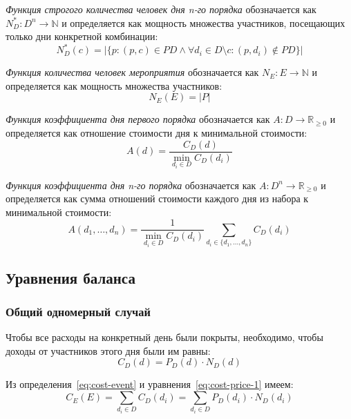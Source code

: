 \textit{Функция строгого количества человек дня n-го порядка} обозначается как $N_D^*: D^n \rightarrow \mathbb{N}$ и определяется как мощность множества участников, посещающих только дни конкретной комбинации:
\begin{equation}
	N_D^*(c) = |\{p:(p, c) \in PD \wedge \forall d_i \in D \setminus c : (p, d_i) \notin PD\}|
\end{equation}

\textit{Функция количества человек мероприятия} обозначается как \newline $N_E: E \rightarrow \mathbb{N}$ и определяется как мощность множества участников:
\begin{equation}
	N_E(E) = |P|
\end{equation}

\textit{Функция коэффициента дня первого порядка} обозначается как \newline $A: D \rightarrow \mathbb{R}_{\ge 0}$ и определяется как отношение стоимости дня к минимальной стоимости:
\begin{equation}
	A(d) = \frac{C_D(d)}{\min_{d_i \in D}{C_D(d_i)}}
\end{equation}

\textit{Функция коэффициента дня n-го порядка} обозначается как \newline $A: D^n \rightarrow \mathbb{R}_{\ge 0}$ и определяется как сумма отношений стоимости каждого дня из набора к минимальной стоимости:
\begin{equation}
	A(d_1, \dots, d_n) = \frac{1}{\min_{d_i \in D}{C_D(d_i)}}\sum_{d_i \in \{d_1, \dots, d_n\}}{C_D(d_i)}
\end{equation}

\subsection{Уравнения баланса}

\subsubsection{Общий одномерный случай}

Чтобы все расходы на конкретный день были покрыты, необходимо, чтобы доходы от участников этого дня были им равны:
\begin{equation}
	C_D(d) = P_D(d) \cdot N_D(d)
	\label{eq:cost-price-1}
\end{equation}

Из определения~\ref{eq:cost-event} и уравнения~\ref{eq:cost-price-1} имеем:
\begin{equation}
	C_E(E) = \sum_{d_i \in D} C_D(d_i) = \sum_{d_i \in D}{P_D(d_i) \cdot N_D(d_i)}
	\label{eq:balance-equation-1}
\end{equation}

